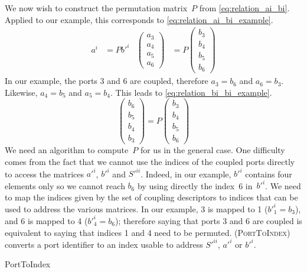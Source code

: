 We now wish to construct the permutation matrix~$P$ from \cref{eq:relation_ai_bi}.
Applied to our example, this corresponds to \cref{eq:relation_ai_bi_example}.
\begin{align}
    a^i
    &=
    P b'^i
    &
    \begin{pmatrix}
        a_3 \\ a_4 \\ a_5 \\ a_6
    \end{pmatrix}
    &=
    P
    \begin{pmatrix}
        b_3 \\ b_4 \\ b_5 \\ b_6
    \end{pmatrix}
    \label{eq:relation_ai_bi_example}
\end{align}
In our example, the ports 3 and 6 are coupled, therefore $a_3 = b_6$ and $a_6 = b_3$.
Likewise, $a_4=b_5$ and $a_5=b_4$.
This leads to \cref{eq:relation_bi_bi_example}.
\begin{equation}
    \begin{pmatrix}
        b_6 \\ b_5 \\ b_4 \\ b_3
    \end{pmatrix}
    =
    P
    \begin{pmatrix}
        b_3 \\ b_4 \\ b_5 \\ b_6
    \end{pmatrix}
    \label{eq:relation_bi_bi_example}
\end{equation}
We need an algorithm to compute~$P$ for us in the general case.
One difficulty comes from the fact that we cannot use the indices of the coupled ports directly to access the matrices $a'^i$, $b'^i$ and $S'^{ii}$.
Indeed, in our example, $b'^i$ contains four elements only so we cannot reach $b_6$ by using directly the index~6 in~$b'^i$.
We need to map the indices given by the set of coupling descriptors to indices that can be used to address the various matrices.
In our example, 3 is mapped to 1 ($b'^i_1 = b_3$), and 6 is mapped to 4 ($b'^i_4 = b_6$); therefore saying that ports 3 and 6 are coupled is equivalent to saying that indices 1 and 4 need to be permuted.
 (\textsc{PortToIndex}) converts a port identifier to an index usable to address $S'^{ii}$, $a'^i$ or $b'^i$.
\begin{algorithm}
    \caption{PortToIndex}
    \label{algo:port_to_index}
    \begin{algorithmic}
         
         
        \\ 
        \EndFunction
    \end{algorithmic}
\end{algorithm}

